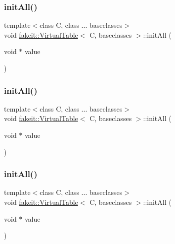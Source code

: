 \subsubsection{\texorpdfstring{initAll()}{initAll()}\hspace{0.1cm}{\footnotesize\ttfamily [2/10]}}
{\footnotesize\ttfamily template$<$class C, class ... baseclasses$>$ \\
void \mbox{\hyperlink{structfakeit_1_1VirtualTable}{fakeit\+::\+Virtual\+Table}}$<$ C, baseclasses $>$\+::init\+All (\begin{DoxyParamCaption}\item[{void $\ast$}]{value }\end{DoxyParamCaption})\hspace{0.3cm}{\ttfamily [inline]}}

\mbox{\label{structfakeit_1_1VirtualTable_a261b66b33067b4425791762cb3786f20}} 
\subsubsection{\texorpdfstring{initAll()}{initAll()}\hspace{0.1cm}{\footnotesize\ttfamily [3/10]}}
{\footnotesize\ttfamily template$<$class C, class ... baseclasses$>$ \\
void \mbox{\hyperlink{structfakeit_1_1VirtualTable}{fakeit\+::\+Virtual\+Table}}$<$ C, baseclasses $>$\+::init\+All (\begin{DoxyParamCaption}\item[{void $\ast$}]{value }\end{DoxyParamCaption})\hspace{0.3cm}{\ttfamily [inline]}}

\mbox{\label{structfakeit_1_1VirtualTable_a261b66b33067b4425791762cb3786f20}} 
\subsubsection{\texorpdfstring{initAll()}{initAll()}\hspace{0.1cm}{\footnotesize\ttfamily [4/10]}}
{\footnotesize\ttfamily template$<$class C, class ... baseclasses$>$ \\
void \mbox{\hyperlink{structfakeit_1_1VirtualTable}{fakeit\+::\+Virtual\+Table}}$<$ C, baseclasses $>$\+::init\+All (\begin{DoxyParamCaption}\item[{void $\ast$}]{value }\end{DoxyParamCaption})\hspace{0.3cm}{\ttfamily [inline]}}

